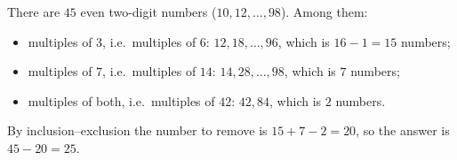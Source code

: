 There are $45$ even two-digit numbers ($10,12,\dots,98$). Among them:
\begin{itemize}
\item multiples of $3$, i.e.\ multiples of $6$: $12,18,\dots,96$, which is $16-1=15$ numbers;
\item multiples of $7$, i.e.\ multiples of $14$: $14,28,\dots,98$, which is $7$ numbers;
\item multiples of both, i.e.\ multiples of $42$: $42,84$, which is $2$ numbers.
\end{itemize}
By inclusion--exclusion the number to remove is $15+7-2=20$, so the answer is $45-20=\boxed{25}$.
